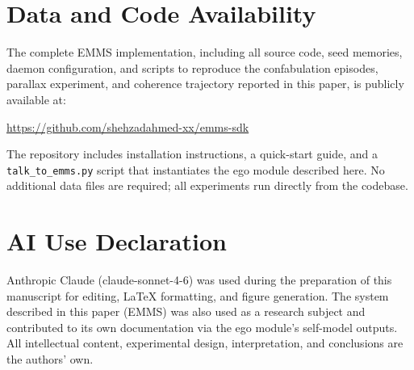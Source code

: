 \documentclass[10pt,twocolumn,a4paper]{article}
\begin{document}
\section*{Data and Code Availability}
The complete EMMS implementation, including all source code, seed memories, daemon configuration, and scripts to reproduce the confabulation episodes, parallax experiment, and coherence trajectory reported in this paper, is publicly available at:

\begin{center}
\url{https://github.com/shehzadahmed-xx/emms-sdk}
\end{center}

\noindent The repository includes installation instructions, a quick-start guide, and a \texttt{talk\_to\_emms.py} script that instantiates the ego module described here. No additional data files are required; all experiments run directly from the codebase.

\section*{AI Use Declaration}
Anthropic Claude (claude-sonnet-4-6) was used during the preparation of this manuscript for editing, LaTeX formatting, and figure generation. The system described in this paper (EMMS) was also used as a research subject and contributed to its own documentation via the ego module's self-model outputs. All intellectual content, experimental design, interpretation, and conclusions are the authors' own.



\end{document}
